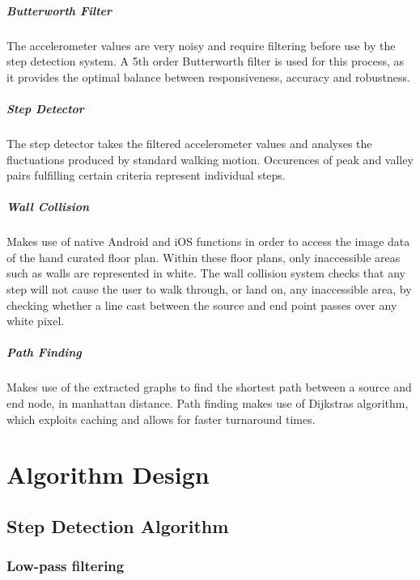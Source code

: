 \documentclass[12pt,a4paper]{report}
\begin{document}
\paragraph{Butterworth Filter}
The accelerometer values are very noisy and require filtering before use by the step detection system. A 5th order Butterworth filter is used for this process, as it provides the optimal balance between responsiveness, accuracy and robustness.

\paragraph{Step Detector}
The step detector takes the filtered accelerometer values and analyses the fluctuations produced by standard walking motion. Occurences of peak and valley pairs fulfilling certain criteria represent individual steps.

\paragraph{Wall Collision}
Makes use of native Android and iOS functions in order to access the image data of the hand curated floor plan. Within these floor plans, only inaccessible areas such as walls are represented in white. The wall collision system checks that any step will not cause the user to walk through, or land on, any inaccessible area, by checking whether a line cast between the source and end point passes over any white pixel.

\paragraph{Path Finding}
Makes use of the extracted graphs to find the shortest path between a source and end node, in manhattan distance. Path finding makes use of Dijkstras algorithm, which exploits caching and allows for faster turnaround times.

\chapter{Algorithm Design}

\section{Step Detection Algorithm}

\subsection{Low-pass filtering}
\end{document}
